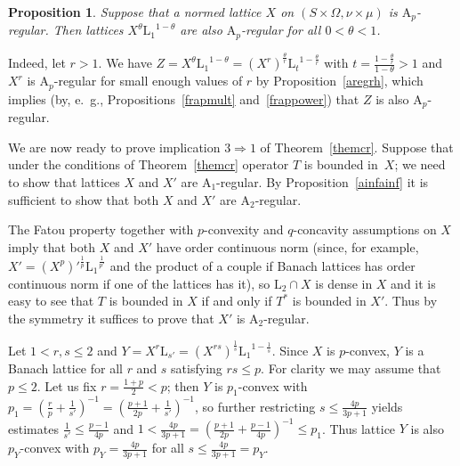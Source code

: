 \documentclass[12pt]{amsart}
\newtheorem {proposition} [theorem] {Proposition}
\newcommand {\apclass} [1] {\ensuremath{\mathrm A_{#1}}}
\newcommand {\lclassg} [1] {\ensuremath{\mathrm L_{#1}}}
\begin{document}
\begin {proposition}
\label {l1clp}
Suppose that a normed lattice $X$ on $(S \times \Omega, \nu \times \mu)$ is $\apclass {p}$-regular.
Then lattices $X^{\theta} \lclassg {1}^{1 - \theta}$ are also $\apclass {p}$-regular for all $0 < \theta < 1$.
\end {proposition}
Indeed, let $r > 1$.  We have
$Z = X^\theta \lclassg {1}^{1 - \theta} = \left(X^r\right)^{\frac \theta r} \lclassg {t}^{1 - \frac \theta r}$
with $t = \frac {1 - \frac \theta r} {1 - \theta} > 1$ and $X^r$ is $\apclass {p}$-regular for small
enough values of $r$ by Proposition~\ref {aregrh},
which implies
(by, e.~g., Propositions~\ref {frapmult} and~\ref {frappower})
that $Z$ is also $\apclass {p}$-regular.

We are now ready to prove implication $3 \Rightarrow 1$ of Theorem~\ref {themcr}.
Suppose that under the conditions of Theorem~\ref {themcr} operator $T$ is bounded in~$X$;
we need to show that lattices $X$ and $X'$ are $\apclass {1}$-regular.
By Proposition~\ref {ainfainf} it is sufficient to show that both $X$ and $X'$ are $\apclass {2}$-regular.

The Fatou property together with $p$-convexity and $q$-concavity assumptions on $X$
imply that both $X$ and $X'$ have order continuous
norm (since, for example, $X' = \left(X^p\right)'^{\frac 1 p} \lclassg {1}^{\frac 1 {p'}}$ and the product of
a couple if Banach lattices has order continuous norm if one of the lattices has it),
so $\lclassg {2} \cap X$ is dense in $X$ and
it is easy to see that $T$ is bounded in $X$ if and only if $T^*$ is bounded in $X'$.  Thus by the symmetry
it suffices to prove that $X'$ is $\apclass {2}$-regular.

Let $1 < r, s \leqslant 2$ and $Y = X^r \lclassg {s'} = (X^{r s})^{\frac 1 s} \lclassg {1}^{1 - \frac 1 s}$.
Since $X$ is $p$-convex, $Y$ is a Banach lattice for all $r$ and $s$ satisfying $r s \leqslant p$.
For clarity we may assume that $p \leqslant 2$.
Let us fix $r = \frac {1 + p} 2 < p$;
then $Y$ is $p_1$-convex with
$p_1 = \left(\frac r p + \frac 1 {s'}\right)^{-1} = \left(\frac {p + 1} {2 p} + \frac 1 {s'}\right)^{-1}$, so 
further restricting $s \leqslant \frac {4 p} {3 p + 1}$ yields estimates
$\frac 1 {s'} \leqslant \frac {p - 1} {4 p}$ and
$1 < \frac {4 p} {3 p + 1} = \left(\frac {p + 1} {2 p} + \frac {p - 1} {4 p}\right)^{-1} \leqslant p_1$.
Thus lattice $Y$ is also $p_Y$-convex with $p_Y = \frac {4 p} {3 p + 1}$ for all $s \leqslant \frac {4 p} {3 p + 1} = p_Y$.
\end{document}
